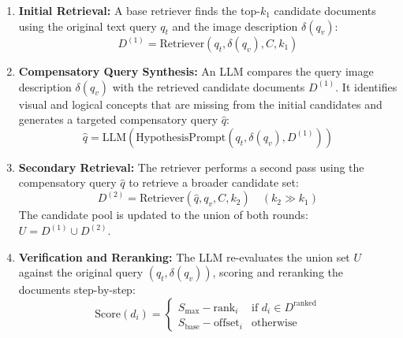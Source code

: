 \documentclass[11pt,a4paper]{article}
\begin{document}
\begin{enumerate}
    \item \textbf{Initial Retrieval:} A base retriever finds the top-$k_1$ candidate documents using the original text query $q_t$ and the image description $\delta(q_v)$:
    \begin{equation}
    D^{(1)} = \text{Retriever}(q_t, \delta(q_v), C, k_1)
    \end{equation}
    \item \textbf{Compensatory Query Synthesis:} An LLM compares the query image description $\delta(q_v)$ with the retrieved candidate documents $D^{(1)}$. It identifies visual and logical concepts that are missing from the initial candidates and generates a targeted compensatory query $\hat{q}$:
    \begin{equation}
    \hat{q} = \text{LLM}(\text{HypothesisPrompt}(q_t, \delta(q_v), D^{(1)}))
    \end{equation}
    \item \textbf{Secondary Retrieval:} The retriever performs a second pass using the compensatory query $\hat{q}$ to retrieve a broader candidate set:
    \begin{equation}
    D^{(2)} = \text{Retriever}(\hat{q}, q_v, C, k_2) \quad (k_2 \gg k_1)
    \end{equation}
    The candidate pool is updated to the union of both rounds: $U = D^{(1)} \cup D^{(2)}$.
    \item \textbf{Verification and Reranking:} The LLM re-evaluates the union set $U$ against the original query $(q_t, \delta(q_v))$, scoring and reranking the documents step-by-step:
    \begin{equation}
    \text{Score}(d_i) = \begin{cases}
    S_{\text{max}} - \text{rank}_i & \text{if } d_i \in D^{\text{ranked}} \\
    S_{\text{base}} - \text{offset}_i & \text{otherwise}
    \end{cases}
    \end{equation}
\end{enumerate}
\end{document}
